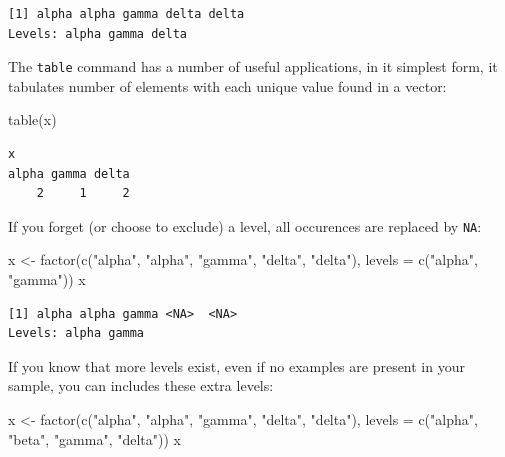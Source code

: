 \documentclass[
]{book}
\newenvironment{Shaded}{\begin{snugshade}}{\end{snugshade}}
\newcommand{\AttributeTok}[1]{\textcolor[rgb]{0.77,0.63,0.00}{#1}}
\newcommand{\FunctionTok}[1]{\textcolor[rgb]{0.00,0.00,0.00}{#1}}
\newcommand{\NormalTok}[1]{#1}
\newcommand{\OtherTok}[1]{\textcolor[rgb]{0.56,0.35,0.01}{#1}}
\newcommand{\StringTok}[1]{\textcolor[rgb]{0.31,0.60,0.02}{#1}}
\begin{document}
\begin{verbatim}
[1] alpha alpha gamma delta delta
Levels: alpha gamma delta
\end{verbatim}

The \texttt{table} command has a number of useful applications, in it simplest form, it tabulates number of elements with each unique value found in a vector:

\begin{Shaded}
\begin{Highlighting}[]
\FunctionTok{table}\NormalTok{(x)}
\end{Highlighting}
\end{Shaded}

\begin{verbatim}
x
alpha gamma delta 
    2     1     2 
\end{verbatim}

If you forget (or choose to exclude) a level, all occurences are replaced by \texttt{NA}:

\begin{Shaded}
\begin{Highlighting}[]
\NormalTok{x }\OtherTok{\textless{}{-}} \FunctionTok{factor}\NormalTok{(}\FunctionTok{c}\NormalTok{(}\StringTok{"alpha"}\NormalTok{, }\StringTok{"alpha"}\NormalTok{, }\StringTok{"gamma"}\NormalTok{, }\StringTok{"delta"}\NormalTok{, }\StringTok{"delta"}\NormalTok{),}
 \AttributeTok{levels =} \FunctionTok{c}\NormalTok{(}\StringTok{"alpha"}\NormalTok{, }\StringTok{"gamma"}\NormalTok{))}
\NormalTok{x}
\end{Highlighting}
\end{Shaded}

\begin{verbatim}
[1] alpha alpha gamma <NA>  <NA> 
Levels: alpha gamma
\end{verbatim}

If you know that more levels exist, even if no examples are present in your sample, you can includes these extra levels:

\begin{Shaded}
\begin{Highlighting}[]
\NormalTok{x }\OtherTok{\textless{}{-}} \FunctionTok{factor}\NormalTok{(}\FunctionTok{c}\NormalTok{(}\StringTok{"alpha"}\NormalTok{, }\StringTok{"alpha"}\NormalTok{, }\StringTok{"gamma"}\NormalTok{, }\StringTok{"delta"}\NormalTok{, }\StringTok{"delta"}\NormalTok{),}
 \AttributeTok{levels =} \FunctionTok{c}\NormalTok{(}\StringTok{"alpha"}\NormalTok{, }\StringTok{"beta"}\NormalTok{, }\StringTok{"gamma"}\NormalTok{, }\StringTok{"delta"}\NormalTok{))}
\NormalTok{x}
\end{Highlighting}
\end{Shaded}
\end{document}
